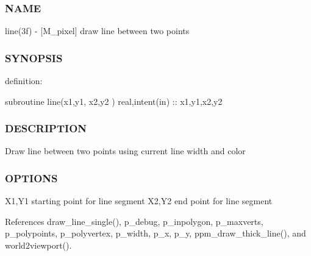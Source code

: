 \subsubsection*{N\+A\+ME}

line(3f) -\/ \mbox{[}M\+\_\+pixel\mbox{]} draw line between two points 

\subsubsection*{S\+Y\+N\+O\+P\+S\+IS}

definition\+:

subroutine line(x1,y1, x2,y2 ) real,intent(in) \+:\+: x1,y1,x2,y2

\subsubsection*{D\+E\+S\+C\+R\+I\+P\+T\+I\+ON}

Draw line between two points using current line width and color

\subsubsection*{O\+P\+T\+I\+O\+NS}

X1,Y1 starting point for line segment X2,Y2 end point for line segment 

References draw\+\_\+line\+\_\+single(), p\+\_\+debug, p\+\_\+inpolygon, p\+\_\+maxverts, p\+\_\+polypoints, p\+\_\+polyvertex, p\+\_\+width, p\+\_\+x, p\+\_\+y, ppm\+\_\+draw\+\_\+thick\+\_\+line(), and world2viewport().

